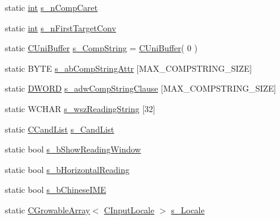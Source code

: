 \begin{DoxyCompactItemize}
static \hyperlink{_d_x_u_tgui_8cpp_a2d77ed03302b6978834ee3b6f57837fb}{int} \hyperlink{class_c_d_x_u_t_i_m_e_edit_box_a468c906ac88033afd0042eef35d21dd0}{s\_\-nCompCaret}
\item 
static \hyperlink{_d_x_u_tgui_8cpp_a2d77ed03302b6978834ee3b6f57837fb}{int} \hyperlink{class_c_d_x_u_t_i_m_e_edit_box_af459146e6164aa670ca187920a3e5ba0}{s\_\-nFirstTargetConv}
\item 
static \hyperlink{class_c_uni_buffer}{CUniBuffer} \hyperlink{class_c_d_x_u_t_i_m_e_edit_box_ab6fd6572bf140a685ca9227690fc8bb1}{s\_\-CompString} = \hyperlink{class_c_uni_buffer}{CUniBuffer}( 0 )
\item 
static BYTE \hyperlink{class_c_d_x_u_t_i_m_e_edit_box_abcf78691a5ecce45e721f4533ebe7a26}{s\_\-abCompStringAttr} \mbox{[}MAX\_\-COMPSTRING\_\-SIZE\mbox{]}
\item 
static \hyperlink{class_c_d_x_u_t_i_m_e_edit_box_a4666fce9b285d692ceb0515bf2dbde90}{DWORD} \hyperlink{class_c_d_x_u_t_i_m_e_edit_box_ac2f3b1d2aedb78d1cf1e4aa1f816c58b}{s\_\-adwCompStringClause} \mbox{[}MAX\_\-COMPSTRING\_\-SIZE\mbox{]}
\item 
static WCHAR \hyperlink{class_c_d_x_u_t_i_m_e_edit_box_a858d222d1a4282ce8154bb3867018e1f}{s\_\-wszReadingString} \mbox{[}32\mbox{]}
\item 
static \hyperlink{struct_c_d_x_u_t_i_m_e_edit_box_1_1_c_cand_list}{CCandList} \hyperlink{class_c_d_x_u_t_i_m_e_edit_box_aba2312ad3f47e27702ce20c5055416e6}{s\_\-CandList}
\item 
static bool \hyperlink{class_c_d_x_u_t_i_m_e_edit_box_a78764a7d5df3030a42d380306d85ea89}{s\_\-bShowReadingWindow}
\item 
static bool \hyperlink{class_c_d_x_u_t_i_m_e_edit_box_aa097905fa88e08934010ce7ead10fb0b}{s\_\-bHorizontalReading}
\item 
static bool \hyperlink{class_c_d_x_u_t_i_m_e_edit_box_afbfbbd0bfc8427fc6eb91f33a7338fcd}{s\_\-bChineseIME}
\item 
static \hyperlink{class_c_growable_array}{CGrowableArray}$<$ \hyperlink{struct_c_d_x_u_t_i_m_e_edit_box_1_1_c_input_locale}{CInputLocale} $>$ \hyperlink{class_c_d_x_u_t_i_m_e_edit_box_adbf262dfa3249b26d569dd04d4cdbb01}{s\_\-Locale}
\end{DoxyCompactItemize}


